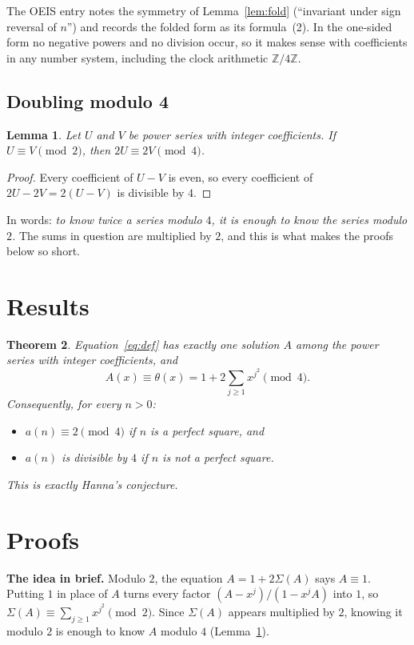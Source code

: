 \documentclass[11pt,a4paper]{article}
\newtheorem{theorem}{Theorem}[section]
\newtheorem{lemma}[theorem]{Lemma}
\theoremstyle{definition}
\theoremstyle{remark}
\newcommand{\Z}{\mathbb{Z}}
\newcommand{\para}[1]{\par\medskip\noindent\textbf{#1}\enspace}
\begin{document}
The OEIS entry notes the symmetry of Lemma~\ref{lem:fold} (``invariant under sign reversal of $n$'') and records the
folded form as its formula~(2). In the one-sided form no negative powers and no division occur, so it makes sense
with coefficients in any number system, including the clock arithmetic $\Z/4\Z$.

\subsection{Doubling modulo 4}
\begin{lemma}\label{lem:double}
Let $U$ and $V$ be power series with integer coefficients. If $U\equiv V\pmod 2$, then $2U\equiv2V\pmod 4$.
\end{lemma}

\begin{proof}
Every coefficient of $U-V$ is even, so every coefficient of $2U-2V=2(U-V)$ is divisible by $4$.
\end{proof}
In words: \emph{to know twice a series modulo $4$, it is enough to know the series modulo $2$.} The sums in
question are multiplied by $2$, and this is what makes the proofs below so short.


\section{Results}\label{sec:results}

\begin{theorem}\label{thm:main}
Equation~\eqref{eq:def} has exactly one solution $A$ among the power series with integer coefficients, and
\[
A(x)\equiv\theta(x)=1+2\sum_{j\ge1}x^{j^2}\pmod 4 .
\]
Consequently, for every $n>0$:
\begin{itemize}
\item $a(n)\equiv2\pmod 4$ if $n$ is a perfect square, and
\item $a(n)$ is divisible by $4$ if $n$ is not a perfect square.
\end{itemize}
This is exactly Hanna's conjecture.
\end{theorem}

\section{Proofs}\label{sec:proofs}

\para{The idea in brief.} Modulo $2$, the equation $A=1+2\Sigma(A)$ says $A\equiv1$. Putting $1$ in place of $A$ turns every factor
$(A-x^j)/(1-x^jA)$ into $1$, so $\Sigma(A)\equiv\sum_{j\ge1}x^{j^2}\pmod2$. Since $\Sigma(A)$ appears multiplied by
$2$, knowing it modulo $2$ is enough to know $A$ modulo $4$ (Lemma~\ref{lem:double}).
\end{document}
